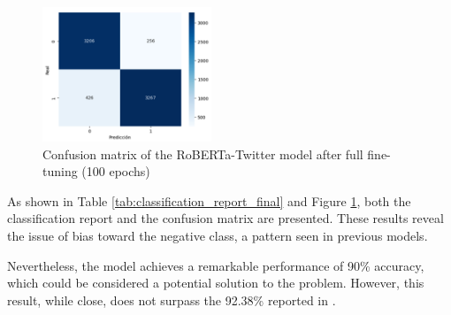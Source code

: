 \begin{figure}[H]
    \centering
    \includegraphics[width=0.45\textwidth]{images/robertaConfusionMatrix100Epochs.png} 
    \caption{Confusion matrix of the RoBERTa-Twitter model after full fine-tuning (100 epochs)}
    \label{fig:roberta_confusion_matrix_100epochs}
\end{figure}

As shown in Table \ref{tab:classification_report_final} and Figure \ref{fig:roberta_confusion_matrix_100epochs}, both the classification report and the confusion matrix are presented. These results reveal the issue of bias toward the negative class, a pattern seen in previous models. 

Nevertheless, the model achieves a remarkable performance of 90\% accuracy, which could be considered a potential solution to the problem. However, this result, while close, does not surpass the 92.38\% reported in \cite{fieri2023offensive}.

